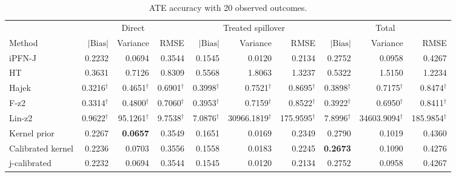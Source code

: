 \begin{table}[tb]
\centering
\caption{ATE accuracy with 20 observed outcomes.}
\begingroup\footnotesize
\setlength{\tabcolsep}{3pt}
\begin{tabular*}{\linewidth}{@{\extracolsep{\fill}}l*{9}{r}@{}}
\toprule
&\multicolumn{3}{c}{Direct}&\multicolumn{3}{c}{Treated spillover}&\multicolumn{3}{c}{Total}\\
\cmidrule(lr){2-4}\cmidrule(lr){5-7}\cmidrule(lr){8-10}
Method&$|\mathrm{Bias}|$&Variance&RMSE&$|\mathrm{Bias}|$&Variance&RMSE&$|\mathrm{Bias}|$&Variance&RMSE\\
\midrule
iPFN-J & \cellcolor{blue!17}0.2232 & \cellcolor{blue!11}0.0694 & \cellcolor{blue!17}0.3544 & \cellcolor{blue!17}0.1545 & \cellcolor{blue!17}0.0120 & \cellcolor{blue!17}0.2134 & \cellcolor{blue!11}0.2752 & \cellcolor{blue!17}0.0958 & \cellcolor{blue!17}0.4267 \\
HT & \cellcolor{blue!2}0.3631 & \cellcolor{blue!2}0.7126 & \cellcolor{blue!2}0.8309 & \cellcolor{blue!2}0.5568 & \cellcolor{blue!2}1.8063 & \cellcolor{blue!2}1.3237 & \cellcolor{blue!2}0.5322 & \cellcolor{blue!2}1.5150 & \cellcolor{blue!2}1.2234 \\
Hajek & 0.3216$^{\dagger}$ & 0.4651$^{\dagger}$ & 0.6901$^{\dagger}$ & 0.3998$^{\dagger}$ & 0.7521$^{\dagger}$ & 0.8695$^{\dagger}$ & 0.3898$^{\dagger}$ & 0.7175$^{\dagger}$ & 0.8474$^{\dagger}$ \\
F-z2 & 0.3314$^{\dagger}$ & 0.4800$^{\dagger}$ & 0.7060$^{\dagger}$ & 0.3953$^{\dagger}$ & 0.7159$^{\dagger}$ & 0.8522$^{\dagger}$ & 0.3922$^{\dagger}$ & 0.6950$^{\dagger}$ & 0.8411$^{\dagger}$ \\
Lin-z2 & 0.9622$^{\dagger}$ & 95.1261$^{\dagger}$ & 9.7538$^{\dagger}$ & 7.0876$^{\dagger}$ & 30966.1819$^{\dagger}$ & 175.9595$^{\dagger}$ & 7.8996$^{\dagger}$ & 34603.9094$^{\dagger}$ & 185.9854$^{\dagger}$ \\
Kernel prior & \cellcolor{blue!4}0.2267 & \cellcolor{blue!24}\textbf{0.0657} & \cellcolor{blue!7}0.3549 & \cellcolor{blue!4}0.1651 & \cellcolor{blue!7}0.0169 & \cellcolor{blue!4}0.2349 & \cellcolor{blue!4}0.2790 & \cellcolor{blue!7}0.1019 & \cellcolor{blue!4}0.4360 \\
Calibrated kernel & \cellcolor{blue!7}0.2236 & \cellcolor{blue!4}0.0703 & \cellcolor{blue!4}0.3556 & \cellcolor{blue!7}0.1558 & \cellcolor{blue!4}0.0183 & \cellcolor{blue!7}0.2245 & \cellcolor{blue!24}\textbf{0.2673} & \cellcolor{blue!4}0.1090 & \cellcolor{blue!7}0.4276 \\
j-calibrated & \cellcolor{blue!17}0.2232 & \cellcolor{blue!11}0.0694 & \cellcolor{blue!17}0.3544 & \cellcolor{blue!17}0.1545 & \cellcolor{blue!17}0.0120 & \cellcolor{blue!17}0.2134 & \cellcolor{blue!11}0.2752 & \cellcolor{blue!17}0.0958 & \cellcolor{blue!17}0.4267 \\

\end{tabular*}
\end{table}
